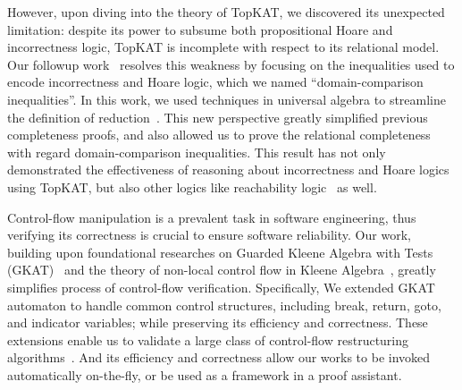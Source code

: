 \documentclass[11pt,a4paper,sans]{moderncv} %
\begin{document}
However, upon diving into the theory of TopKAT, we discovered its unexpected limitation: despite its power to subsume both propositional Hoare and incorrectness logic, TopKAT is incomplete with respect to its relational model. 
Our followup work~\cite{zhang_DomainReasoningTopKAT_2024} resolves this weakness by focusing on the inequalities used to encode incorrectness and Hoare logic, which we named ``domain-comparison inequalities''. 
In this work, we used techniques in universal algebra to streamline the definition of reduction~\cite{pous_ToolsCompletenessKleene_2021,kozen_KleeneAlgebraTests_1997c}.
This new perspective greatly simplified previous completeness proofs, and also allowed us to prove the relational completeness with regard domain-comparison inequalities. 
This result has not only demonstrated the effectiveness of reasoning about incorrectness and Hoare logics using TopKAT, but also other logics like reachability logic~\cite{naus_ReachabilityLogicLowLevel_2022a} as well.



Control-flow manipulation is a prevalent task in software engineering, thus verifying its correctness is crucial to ensure software reliability.
Our work, building upon foundational researches on Guarded Kleene Algebra with Tests (GKAT)~\cite{smolka_GuardedKleeneAlgebra_2020} and the theory of non-local control flow in Kleene Algebra~\cite{kozen_NonlocalFlowControl_2008a}, greatly simplifies process of control-flow verification.
Specifically, We extended GKAT automaton to handle common control structures, including break, return, goto, and indicator variables; while preserving its efficiency and correctness.
These extensions enable us to validate a large class of control-flow restructuring algorithms~\cite{yakdan_NoMoreGotos_2015,basque_AhoySAILRThere_,erosa_TamingControlFlow_1994,kozen_CertificationCompilerOptimizations_2000d}.
And its efficiency and correctness allow our works to be invoked automatically on-the-fly, or be used as a framework in a proof assistant.
\end{document}
